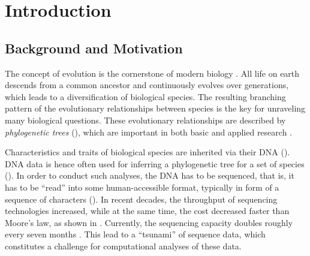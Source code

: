 
\chapter{Introduction}
\label{ch:Introduction}


\section{Background and Motivation}
\label{ch:Introduction:sec:Motivation}

The concept of evolution is the cornerstone of modern biology \cite{Dobzhansky1973}.
All life on earth descends from a common ancestor and continuously evolves over generations,
which leads to a diversification of biological species.
The resulting branching pattern of the evolutionary relationships between species
is the key for unraveling many biological questions.
These evolutionary relationships are described by \emph{phylogenetic trees}
(),
which are important in both basic \cite{Misof2014,Jarvis2014,Zanne2014} and
applied research \cite{Futuyma1995,Hendry2011,Schwartz2017}.

Characteristics and traits of biological species are inherited via their DNA
().
DNA data is hence often used for inferring a phylogenetic tree for a set of species
().
In order to conduct such analyses, the DNA has to be sequenced,
that is, it has to be ``read'' into some human-accessible format,
typically in form of a sequence of characters
().
In recent decades, the throughput of sequencing technologies increased,
while at the same time, the cost decreased faster than Moore's law,
as shown in .
Currently, the sequencing capacity doubles roughly every seven months \cite{Stephens2015}.
This lead to a ``tsunami'' of sequence data,
which constitutes a challenge for computational analyses of these data.

